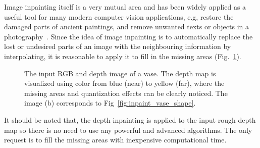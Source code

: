 
Image inpainting itself is a very mutual area and has been widely applied as a useful tool for many modern computer vision applications, e.g, restore the damaged parts of ancient paintings, and remove unwanted texts or objects in a photography~\cite{bertalmio2000image}. 
Since the idea of image inpainting is to automatically replace the lost or undesired parts of an image with the neighbouring information by interpolating, it is reasonable to apply it to fill in the missing areas (Fig.~\ref{fig:inpainting1}).

\begin{figure}[!htbp]
\centering
{}
\caption{The input RGB and depth image of a vase. The depth map is visualized using color from blue (near) to yellow (far), where the missing areas and quantization effects can be clearly noticed. The image (b) corresponds to Fig~\ref{fig:inpaint_vase_shape}.}
\label{fig:inpainting1}
\end{figure}

It should be noted that, the depth inpainting is applied to the input rough depth map so there is no need to use any powerful and advanced algorithms.
The only request is to fill the missing areas with inexpensive computational time.

